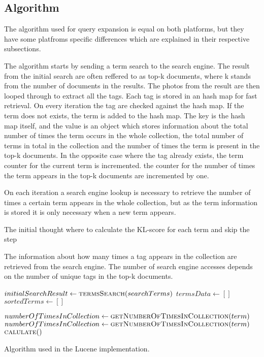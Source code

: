 \subsection{Algorithm}
The algorithm used for query expansion is equal on both platforms,
but they have some platfroms specific differences which are explained in their respective subsections.

The algorithm starts by sending a term search to the search engine.
The result from the initial search are often reffered to as top-k documents,
where k stands from the number of documents in the results.
The photos from the result are then looped through to extract all the tags.
Each tag is stored in an hash map for fast retrieval.
On every iteration the tag are checked against the hash map.
If the term does not exists,
the term is added to the hash map.
The key is the hash map itself,
and the value is an object which stores information about the total number of times the term occurs in the whole collection,
the total number of terms in total in the collection and the number of times the term is present in the top-k documents.
In the opposite case where the tag already exists, the term counter for the current term is incremented.
the counter for the number of times the term appears in the top-k documents are incremented by one.

On each iteration a search engine lookup is necessary to retrieve the number of times a certain term appears in the whole collection,
but as the term information is stored it is only necessary when a new term appears.


The initial thought where to calculate the KL-score for each term and skip the step

The information about how many times a tag appears in the collection are retrieved from the search engine.
The number of search engine accesses depends on the number of unique tags in the top-k documents.

\begin{algorithm}
  \begin{algorithmic}
    \State $initialSearchResult \gets \Call{termsSearch}{searchTerms}$
    \State $termsData \gets [ ]$
    \State $sortedTerms \gets [ ]$

        \State $numberOfTimesInCollection \gets \Call{getNumberOfTimesInCollection}{term}$
        \State $numberOfTimesInCollection \gets \Call{getNumberOfTimesInCollection}{term}$
        \State {}
      \EndFor
    \EndFor
      \State $\Call{calulate}$
    \EndFor

  \end{algorithmic}
  \caption{Algorithm used in the Lucene implementation.}
\end{algorithm}
